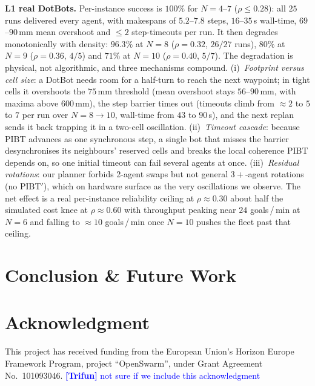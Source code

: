 \documentclass[sigconf, 9pt, nonacm]{acmart}
\newcommand*{\trifun}[1]        {\textcolor{blue}{\textbf{[Trifun]} #1}}
\begin{document}
\textbf{L1 real DotBots.}
Per-instance success is $100\%$ for $N=4$--$7$ ($\rho\le0.28$): all $25$ runs delivered
every agent, with makespans of $5.2$--$7.8$ steps, $16$--$35$\,s wall-time, $69$--$90$\,mm
mean overshoot and $\le2$ step-timeouts per run. It then degrades monotonically with
density: $96.3\%$ at $N=8$ ($\rho=0.32$, $26/27$ runs), $80\%$ at $N=9$ ($\rho=0.36$,
$4/5$) and $71\%$ at $N=10$ ($\rho=0.40$, $5/7$). The degradation is physical, not
algorithmic, and three mechanisms compound. (i)~\emph{Footprint versus cell size}: a
DotBot needs room for a half-turn to reach the next waypoint; in tight cells it overshoots
the $75$\,mm threshold (mean overshoot stays $56$--$90$\,mm, with maxima above $600$\,mm),
the step barrier times out (timeouts climb from $\approx2$ to $5$ to $7$ per run over
$N=8\!\to\!10$, wall-time from $43$ to $90$\,s), and the next replan sends it back
trapping it in a two-cell oscillation. (ii)~\emph{Timeout
cascade}: because PIBT advances as one synchronous step, a single bot that misses the
barrier desynchronises its neighbours' reserved cells and breaks the local coherence PIBT
depends on, so one initial timeout can fail several agents at once. (iii)~\emph{Residual
rotations}: our planner forbids 2-agent swaps but not general $3{+}$-agent rotations (no
PIBT$'$), which on hardware surface as the very oscillations we observe. The net effect is
a real per-instance reliability ceiling at $\rho\approx0.30$ about half the simulated
cost knee at $\rho\approx0.60$ with throughput peaking near $24$ goals\,/\,min at
$N=6$ and falling to $\approx10$ goals\,/\,min once $N=10$ pushes the fleet past that
ceiling.

\section{Conclusion \& Future Work}
\label{sec:conclusion}

\section*{Acknowledgment}

This project has received funding from
    the European Union's Horizon Europe Framework Program, project ``OpenSwarm'', under Grant Agreement No.~101093046. \trifun{not sure if we include this acknowledgment}



\end{document}
